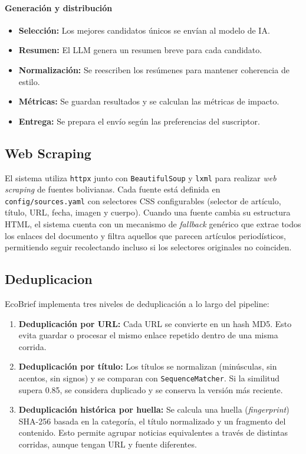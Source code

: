 \documentclass[12pt,oneside]{report}
\begin{document}
\paragraph{Generaci\'on y distribuci\'on}
\begin{itemize}[nosep]
    \item \textbf{Selecci\'on:} Los mejores candidatos \'unicos se env\'ian al modelo de IA.
    \item \textbf{Resumen:} El LLM genera un resumen breve para cada candidato.
    \item \textbf{Normalizaci\'on:} Se reescriben los res\'umenes para mantener coherencia de estilo.
    \item \textbf{M\'etricas:} Se guardan resultados y se calculan las m\'etricas de impacto.
    \item \textbf{Entrega:} Se prepara el env\'io seg\'un las preferencias del suscriptor.
\end{itemize}

\subsection{Web Scraping}

El sistema utiliza \texttt{httpx} junto con \texttt{BeautifulSoup} y \texttt{lxml} para realizar \textit{web scraping} de fuentes bolivianas. Cada fuente est\'a definida en \texttt{config/sources.yaml} con selectores CSS configurables (selector de art\'iculo, t\'itulo, URL, fecha, imagen y cuerpo). Cuando una fuente cambia su estructura HTML, el sistema cuenta con un mecanismo de \textit{fallback} gen\'erico que extrae todos los enlaces del documento y filtra aquellos que parecen art\'iculos period\'isticos, permitiendo seguir recolectando incluso si los selectores originales no coinciden.

\subsection{Deduplicacion}

EcoBrief implementa tres niveles de deduplicaci\'on a lo largo del pipeline:

\begin{enumerate}[nosep]
    \item \textbf{Deduplicaci\'on por URL:} Cada URL se convierte en un hash MD5. Esto evita guardar o procesar el mismo enlace repetido dentro de una misma corrida.
    \item \textbf{Deduplicaci\'on por t\'itulo:} Los t\'itulos se normalizan (min\'usculas, sin acentos, sin signos) y se comparan con \texttt{SequenceMatcher}. Si la similitud supera 0.85, se considera duplicado y se conserva la versi\'on m\'as reciente.
    \item \textbf{Deduplicaci\'on hist\'orica por huella:} Se calcula una huella (\textit{fingerprint}) SHA-256 basada en la categor\'ia, el t\'itulo normalizado y un fragmento del contenido. Esto permite agrupar noticias equivalentes a trav\'es de distintas corridas, aunque tengan URL y fuente diferentes.
\end{enumerate}
\end{document}
